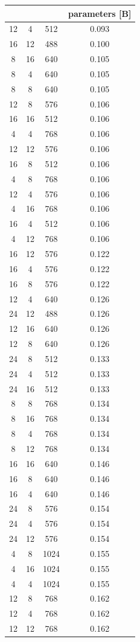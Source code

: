 \documentclass[dvipsnames,11pt]{article}
\begin{document}
\begin{appendix}
\begin{table}[tp]
\begin{tabular}{cccc}
 & & & parameters [B]\\
\midrule
12 & 4 & 512 & 0.093\\
16 & 12 & 488 & 0.100\\
8 & 16 & 640 & 0.105\\
8 & 4 & 640 & 0.105\\
8 & 8 & 640 & 0.105\\
12 & 8 & 576 & 0.106\\
16 & 16 & 512 & 0.106\\
4 & 4 & 768 & 0.106\\
12 & 12 & 576 & 0.106\\
16 & 8 & 512 & 0.106\\
4 & 8 & 768 & 0.106\\
12 & 4 & 576 & 0.106\\
4 & 16 & 768 & 0.106\\
16 & 4 & 512 & 0.106\\
4 & 12 & 768 & 0.106\\
16 & 12 & 576 & 0.122\\
16 & 4 & 576 & 0.122\\
16 & 8 & 576 & 0.122\\
12 & 4 & 640 & 0.126\\
24 & 12 & 488 & 0.126\\
12 & 16 & 640 & 0.126\\
12 & 8 & 640 & 0.126\\
24 & 8 & 512 & 0.133\\
24 & 4 & 512 & 0.133\\
24 & 16 & 512 & 0.133\\
8 & 8 & 768 & 0.134\\
8 & 16 & 768 & 0.134\\
8 & 4 & 768 & 0.134\\
8 & 12 & 768 & 0.134\\
16 & 16 & 640 & 0.146\\
16 & 8 & 640 & 0.146\\
16 & 4 & 640 & 0.146\\
24 & 8 & 576 & 0.154\\
24 & 4 & 576 & 0.154\\
24 & 12 & 576 & 0.154\\
4 & 8 & 1024 & 0.155\\
4 & 16 & 1024 & 0.155\\
4 & 4 & 1024 & 0.155\\
12 & 8 & 768 & 0.162\\
12 & 4 & 768 & 0.162\\
12 & 12 & 768 & 0.162\\

\end{tabular}
\end{table}
\end{appendix}
\end{document}
